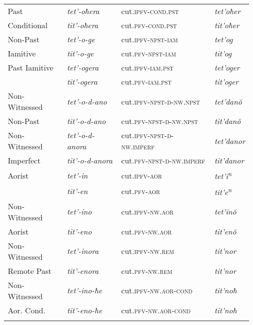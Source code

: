 {\begin{longtable}{ *4{l} }
Past & \textit{tet'-oħera} & cut.\textsc{ipfv-cond.pst} & \textit{tet'oħer} \\
\quad Conditional& \textit{tit'-oħera} & cut.\textsc{pfv-cond.pst} & \textit{tit'oħer} \\\addlinespace

Non-Past  & \textit{tet'-o-ge} & cut.\textsc{ipfv-npst-iam} & \textit{tet'og} \\
\quad Iamitive& \textit{tit'-o-ge} & cut.\textsc{pfv-npst-iam} & \textit{tit'og} \\\addlinespace

Past Iamitive & \textit{tet'-ogera} & cut.\textsc{ipfv-iam.pst} & \textit{tet'oger} \\
& \textit{tit'-ogera} & cut.\textsc{pfv-iam.pst} & \textit{tit'oger} \\\addlinespace
  
Non-Witnessed & \textit{tet'-o-d-ano} & cut.\textsc{ipfv-npst-d-nw.npst} & \textit{tet'dan\u{o}} \\
\quad Non-Past  & \textit{tit'-o-d-ano} & cut.\textsc{pfv-npst-d-nw.npst} & \textit{tit'dan\u{o}} \\\addlinespace
  
Non-Witnessed & \textit{tet'-o-d-anora} & cut.\textsc{ipfv-npst-d-nw.imperf} & \textit{tet'danor} \\
\quad Imperfect   & \textit{tit'-o-d-anora} & cut.\textsc{pfv-npst-d-nw.imperf} & \textit{tit'danor} \\\addlinespace

Aorist  & \textit{tet'-in} & cut.\textsc{ipfv-aor} & \textit{tet'i\textsuperscript{n}} \\
 & \textit{tit'-en} & cut.\textsc{pfv-aor} & \textit{tit'e\textsuperscript{n}} \\\addlinespace
 
Non-Witnessed & \textit{tet'-ino} & cut.\textsc{ipfv-nw.aor} & \textit{tet'in\u{o}} \\
\quad Aorist   & \textit{tit'-eno} & cut.\textsc{pfv-nw.aor} & \textit{tit'en\u{o}} \\\addlinespace
 
Non-Witnessed & \textit{tet'-inora} & cut.\textsc{ipfv-nw.rem} & \textit{tit'nor} \\
\quad Remote Past  & \textit{tit'-enora} & cut.\textsc{pfv-nw.rem} & \textit{tit'nor} \\\addlinespace
 
Non-Witnessed   & \textit{tet'-ino-ħe} & cut.\textsc{ipfv-nw.aor-cond} & \textit{tit'noħ} \\
\quad Aor. Cond. & \textit{tit'-eno-ħe} & cut.\textsc{pfv-nw.aor-cond} & \textit{tit'noħ} \\\addlinespace
 

\end{longtable}}
